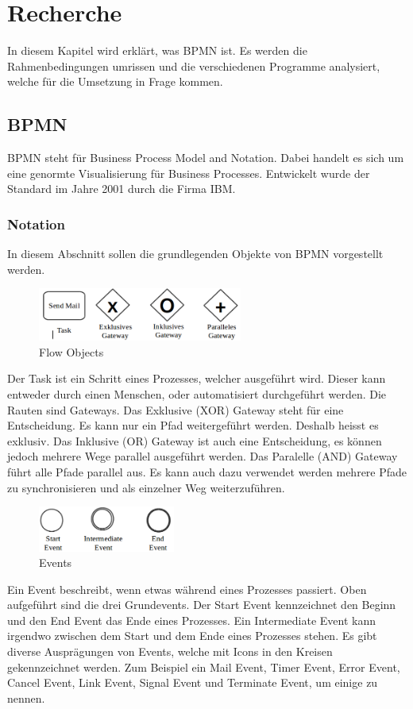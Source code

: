 \chapter{Recherche}

In diesem Kapitel wird erklärt, was BPMN ist. Es werden die Rahmenbedingungen umrissen und die verschiedenen Programme analysiert, welche für die Umsetzung in Frage kommen.

\section{BPMN}
BPMN steht für Business Process Model and Notation. Dabei handelt es sich um eine genormte Visualisierung für Business Processes. Entwickelt wurde der Standard im Jahre 2001 durch die Firma IBM.

\subsection{Notation}
\label{sec:Recherche:bpmn:notation}
In diesem Abschnitt sollen die grundlegenden Objekte von BPMN vorgestellt werden.

\begin{figure}[H]
	\centering
	\includegraphics[width=0.6\textwidth]{images/bpmn-flow-objects.png}
	\caption{Flow Objects}
	\label{fig:recherche:bpmn:flowobjects}
\end{figure}
Der Task ist ein Schritt eines Prozesses, welcher ausgeführt wird. Dieser kann entweder durch einen Menschen, oder automatisiert durchgeführt werden. Die Rauten sind Gateways. Das Exklusive (XOR) Gateway steht für eine Entscheidung. Es kann nur ein Pfad weitergeführt werden. Deshalb heisst es exklusiv. Das Inklusive (OR) Gateway ist auch eine Entscheidung, es können jedoch mehrere Wege parallel ausgeführt werden. Das Paralelle (AND) Gateway führt alle Pfade parallel aus. Es kann auch dazu verwendet werden mehrere Pfade zu synchronisieren und als einzelner Weg weiterzuführen.

\begin{figure}[H]
	\centering
	\includegraphics[width=0.4\textwidth]{images/bpmn-flow-objects2.png}
	\caption{Events}
	\label{fig:recherche:bpmn:events}
\end{figure}
Ein Event beschreibt, wenn etwas während eines Prozesses passiert. Oben aufgeführt sind die drei Grundevents. Der Start Event kennzeichnet den Beginn und den End Event das Ende eines Prozesses. Ein Intermediate Event kann irgendwo zwischen dem Start und dem Ende eines Prozesses stehen. Es gibt diverse Ausprägungen von Events, welche mit Icons in den Kreisen gekennzeichnet werden. Zum Beispiel ein Mail Event, Timer Event, Error Event, Cancel Event, Link Event, Signal Event und Terminate Event, um einige zu nennen.


